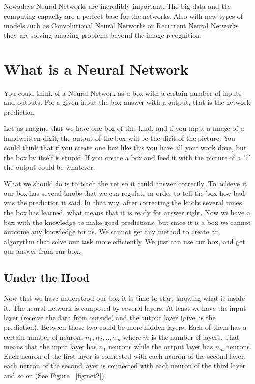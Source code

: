Nowadays Neural Networks are incredibly important. The big data and the computing capacity are a perfect base for the networks. Also with new types of models such as Convolutional Neural Networks or Recurrent Neural Networks they are solving amazing problems beyond the image recognition. \cite{hnet1} \cite{hnet2}

\section{What is a Neural Network}
You could think of a Neural Network as a box with a certain number of inputs and outputs. For a given input the box answer with a output, that is the network prediction.

Let us imagine that we have one box of this kind, and if you input a image of a handwritten digit, the output of the box will be the digit of the picture. You could think that if you create one box like this you have all your work done, but the box by itself is stupid. If you create a box and feed it with the picture of a '1' the output could be whatever.

What we should do is to teach the net so it could answer correctly. To achieve it our box has several knobs that we can regulate in order to tell the box how bad was the prediction it said. In that way, after correcting the knobs several times, the box has learned, what means that it is ready for answer right. Now we have a box with the knowledge to make good predictions, but since it is a box we cannot outcome any knowledge for us. We cannot get any method to create an algorythm that solve our task more efficiently. We just can use our box, and get our answer from our box.

\subsection{Under the Hood}
Now that we have understood our box it is time to start knowing what is inside it. The neural network is composed by several layers. At least we have the input layer (receive the data from outside) and the output layer (give us the prediction). Between those two could be more hidden layers. Each of them has a certain number of neurons $n_1, n_2, .., n_m$ where $m$ is the number of layers. That means that the input layer has $n_1$ neurons while the output layer has $n_m$ neurons. Each neuron of the first layer is connected with each neuron of the second layer, each neuron of the second layer is connected with each neuron of the third layer and so on (See Figure ~\ref{fig:net2}). \\

